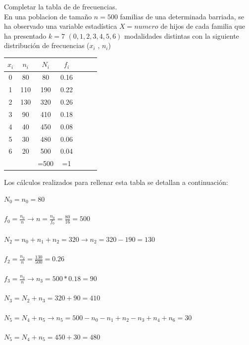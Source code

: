 \subproblem
Completar la tabla de de  frecuencias.
\\

En una poblacion de tamaño $n = 500$ familias de una determinada barriada, se ha observado una variable estadística $ X = numero$  de hijos de cada familia que ha presentado $k = 7$ $(0,1,2,3,4,5,6)$ modalidades distintas con la siguiente distribución de frecuencias ($x_{i}$ , $n_{i}$)
	\begin{center}
		\begin{tabular}{ | c | c | c | c | c | c | c | }
	
	
	\hline	
	$x_{i}$ & $n_{i}$ & $N_{i}$ & $f_{i}$ \\ \hline
	0 & 80 & 80  & 0.16 \\
	1 & 110 & 190  & 0.22  \\
	2 & 130 & 320 & 0.26 \\
	3 & 90 & 410  & 0.18 \\ 
	4 & 40 & 450  & 0.08  \\
	5 & 30 & 480 & 0.06 \\
	6 & 20 & 500 & 0.04 \\\hline
	 &  & =500 & =1 \\\hline
	 
\end{tabular}
	\end{center}

Los cálculos realizados para rellenar esta tabla se detallan a continuación: 

		$ N_{0} = n_{0} = 80 $\\ \\
		$ f_{0} = \frac{n_{0}}{n} \rightarrow n = \frac{n_{0}}{f_{0}} =  \frac{80}{16} = 500 $\\ \\
		$ N_{2} = n_{0} + n_{1} + n_{2} = 320 \rightarrow n_{2} = 320 - 190 = 130 $ \\ \\
		$ f_{2} = \frac{n_{2}}{n} = \frac{130}{500} = 0.26$\\ \\
		$ f_{3} = \frac{n_{3}}{n} \rightarrow n_{3} = 500 * 0.18 = 90 $\\ \\
		$ N_{3} =N_{2} + n_{3} = 320 + 90 = 410  $\\ \\
		$ N_{5} =N_{4} + n_{5}  \rightarrow  n_{5}= 500 - n_{0} - n_{1} + n_{2} -n_{3} + n_{4} + n_{6} = 30 $ \\ \\
		$ N_{5} =N_{4} + n_{5} = 450 + 30 = 480 $\\ 
		
